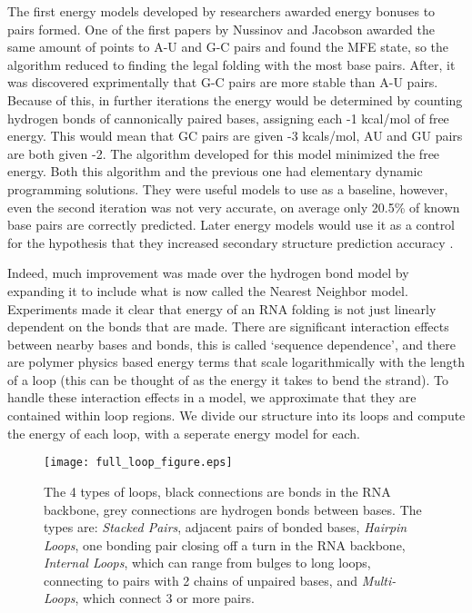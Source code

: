  The first energy models developed by researchers awarded energy
 bonuses to pairs formed. One of the first papers by Nussinov and
 Jacobson \cite{nussinov1980fast} awarded the same amount of points to
 A-U and G-C pairs and found the MFE state, so the algorithm reduced
 to finding the legal folding with the most base pairs. After, it was
 discovered exprimentally that G-C pairs are more stable than A-U
 pairs. Because of this, in further iterations the energy would be
 determined by counting hydrogen bonds of cannonically paired bases,
 assigning each -1 kcal/mol of free energy. This would mean that GC
 pairs are given -3 kcals/mol, AU and GU pairs are both given -2. The
 algorithm developed for this model minimized the free energy. Both
 this algorithm and the previous one had elementary dynamic
 programming solutions. They were useful models to use as a baseline,
 however, even the second iteration was not very accurate, on average
 only 20.5\% of known base pairs are correctly predicted. Later energy
 models would use it as a control for the hypothesis that they
 increased secondary structure prediction accuracy
 \cite{mathews1999expanded}.

Indeed, much improvement was made over the hydrogen bond model by
expanding it to include what is now called the Nearest Neighbor
model. Experiments made it clear that energy of an RNA folding is not
just linearly dependent on the bonds that are made. There are
significant interaction effects between nearby bases and bonds, this
is called `sequence dependence', and there are polymer physics based
energy terms that scale logarithmically with the length of a loop
(this can be thought of as the energy it takes to bend the strand). To
handle these interaction effects in a model, we approximate that they
are contained within loop regions. We divide our structure into its
loops and compute the energy of each loop, with a seperate energy
model for each.

\begin{figure}[t]
\texttt{[image: full\_loop\_figure.eps]}
\caption{The 4 types of loops, black connections are bonds in the RNA
  backbone, grey connections are hydrogen bonds between bases. The
  types are: \textit{Stacked Pairs}, adjacent pairs of bonded bases,
  \textit{Hairpin Loops}, one bonding pair closing off a turn in the
  RNA backbone, \textit{Internal Loops}, which can range from bulges
  to long loops, connecting to pairs with 2 chains of unpaired bases,
  and \textit{Multi-Loops}, which  connect 3 or more pairs.}
\label{fig:loopFigure}
\end{figure}

